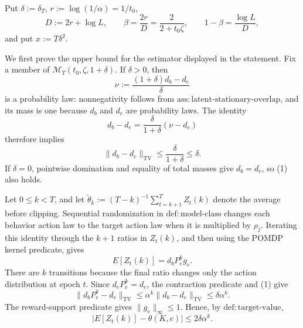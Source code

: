 Put \(\delta:=\delta_T\), \(r:=\log(1/\alpha)=1/t_0\),
\[
 D:=2r+\log L,
 \qquad
 \beta=\frac{2r}{D}=\frac{2}{2+t_0\zeta},
 \qquad
 1-\beta=\frac{\log L}{D},
\]
and put \(x:=T\delta^2\).

We first prove the upper bound for the estimator displayed in the statement.  Fix a member of \(\mathcal M_T(t_0,\zeta,1+\delta)\).  If \(\delta>0\), then
\[
 \nu:=\frac{(1+\delta)d_b-d_e}{\delta}
\]
is a probability law: nonnegativity follows from \(\mathrm{ass{:}latent\text{-}stationary\text{-}overlap}\), and its mass is one because \(d_b\) and \(d_e\) are probability laws.  The identity
\[
 d_b-d_e=\frac{\delta}{1+\delta}(\nu-d_e)
\]
therefore implies
\[
 \lVert d_b-d_e\rVert_{\mathrm{TV}}
 \le \frac{\delta}{1+\delta}\le\delta. \tag{1}
\]
If \(\delta=0\), pointwise domination and equality of total masses give \(d_b=d_e\), so (1) also holds.

Let \(0\le k<T\), and let \(\widetilde\theta_k:=(T-k)^{-1}\sum_{t=k+1}^T Z_t(k)\) denote the average before clipping.  Sequential randomization in \(\mathrm{def{:}model\text{-}class}\) changes each behavior action law to the target action law when it is multiplied by \(\rho_j\).  Iterating this identity through the \(k+1\) ratios in \(Z_t(k)\), and then using the POMDP kernel predicate, gives
\[
 E[Z_t(k)]=d_bP_e^kg_e.
\]
There are \(k\) transitions because the final ratio changes only the action distribution at epoch \(t\).  Since \(d_eP_e^k=d_e\), the contraction predicate and (1) give
\[
 \lVert d_bP_e^k-d_e\rVert_{\mathrm{TV}}
 \le \alpha^k\lVert d_b-d_e\rVert_{\mathrm{TV}}
 \le\delta\alpha^k.
\]
The reward-support predicate gives \(\lVert g_e\rVert_\infty\le1\).  Hence, by \(\mathrm{def{:}target\text{-}value}\),
\[
 \bigl|E[Z_t(k)]-\theta(K,e)\bigr|
 \le2\delta\alpha^k. \tag{2}
\]

